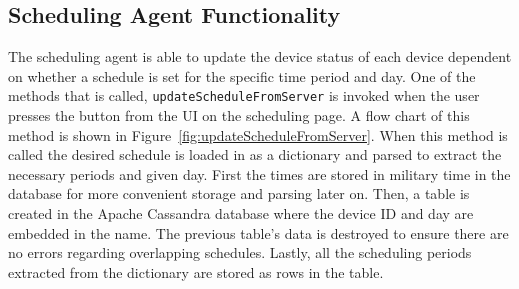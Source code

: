 \subsection{Scheduling Agent Functionality}
The scheduling agent is able to update the device status of each device dependent on whether a schedule is set for the specific time period and day. One of the methods that is called, \texttt{updateScheduleFromServer} is invoked when the user presses the  button from the UI on the scheduling page. A flow chart of this method is shown in Figure~\ref{fig:updateScheduleFromServer}. When this method is called the desired schedule is loaded in as a dictionary and parsed to extract the necessary periods and given day. First the times are stored in military time in the database for more convenient storage and parsing later on. Then, a table is created in the Apache Cassandra database where the device ID and day are embedded in the name. The previous table's data is destroyed to ensure there are no errors regarding overlapping schedules. Lastly, all the scheduling periods extracted from the dictionary are stored as rows in the table. 

